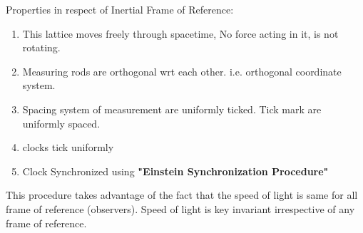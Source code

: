 \documentclass[11pt,a4paper]{article}
\begin{document}
\begin{enumerate}
\begin{enumerate}
\begin{enumerate}
                              Properties in respect of Inertial Frame of Reference:
                              \begin{enumerate}
                                  \item This lattice moves freely through spacetime, No force acting in it, is not rotating.
                                  \item Measuring rods are orthogonal wrt each other. i.e. orthogonal coordinate system.
                                  \item Spacing system of measurement are uniformly ticked. Tick mark are uniformly spaced.
                                  \item clocks tick uniformly
                                  \item Clock Synchronized using \textbf{"Einstein Synchronization Procedure"}
                              \end{enumerate}
                              This procedure takes advantage of the fact that the speed of light is same for all frame of reference (observers). Speed of light is key invariant irrespective of any frame of reference.
                              \begin{figure}[H]
                                  \centering
\end{figure}
\end{enumerate}
\end{enumerate}
\end{enumerate}
\end{document}
